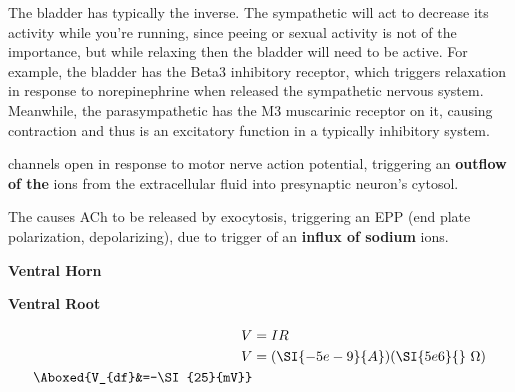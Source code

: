 \documentclass[plain,basic]{inVerba-notes}
\begin{document}
\begin{enumerate}
  The bladder has typically the inverse. The sympathetic will act to decrease its activity while you're running, since peeing or sexual activity is not of the importance, but while relaxing then the bladder will need to be active. For example, the bladder has the Beta3 inhibitory receptor, which triggers relaxation in response to norepinephrine when released the sympathetic nervous system. Meanwhile, the parasympathetic has the M3 muscarinic receptor on it, causing contraction and thus is an excitatory function in a typically inhibitory system.

  

   channels open in response to motor nerve action potential, triggering an \textbf{outflow of the } ions from the extracellular fluid into presynaptic neuron's cytosol.


  The  causes ACh to be released by exocytosis, triggering an EPP (end plate polarization, depolarizing), due to trigger of an \textbf{influx of sodium} ions.


  \begin{center}
    \textbf{Ventral Horn}
  \end{center}
  

  \begin{center}
    \textbf{Ventral Root}
  \end{center}

  
  \begin{align*}
    V&=IR\\
    V&=(\SI{-5e-9}{A})(\SI{5e6}{}~\Omega )\\
    \Aboxed{V_{df}&=-\SI{25}{mV}}
  \end{align*}


\end{enumerate}
\end{document}
